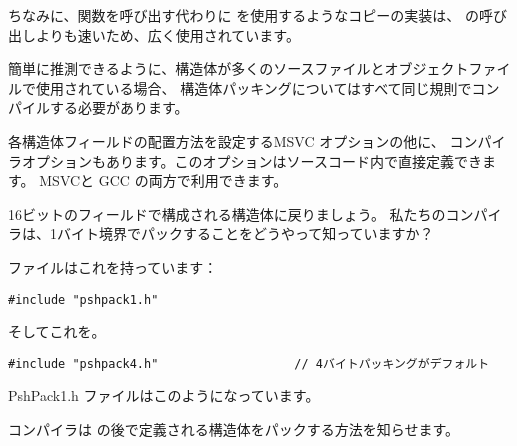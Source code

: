 ちなみに、関数を呼び出す代わりに \MOV を使用するようなコピーの実装は、
の呼び出しよりも速いため、広く使用されています。

簡単に推測できるように、構造体が多くのソースファイルとオブジェクトファイルで使用されている場合、
構造体パッキングについてはすべて同じ規則でコンパイルする必要があります。

各構造体フィールドの配置方法を設定するMSVC オプションの他に、
コンパイラオプションもあります。このオプションはソースコード内で直接定義できます。 
MSVC\FNURLMSDNZP と GCC\FNURLGCCPC{} の両方で利用できます。

16ビットのフィールドで構成される構造体に戻りましょう。
私たちのコンパイラは、1バイト境界でパックすることをどうやって知っていますか？

ファイルはこれを持っています：

\begin{lstlisting}[caption=WinNT.h,style=customc]
#include "pshpack1.h"
\end{lstlisting}

そしてこれを。

\begin{lstlisting}[caption=WinNT.h,style=customc]
#include "pshpack4.h"                   // 4バイトパッキングがデフォルト
\end{lstlisting}

PshPack1.h ファイルはこのようになっています。



コンパイラは  の後で定義される構造体をパックする方法を知らせます。


